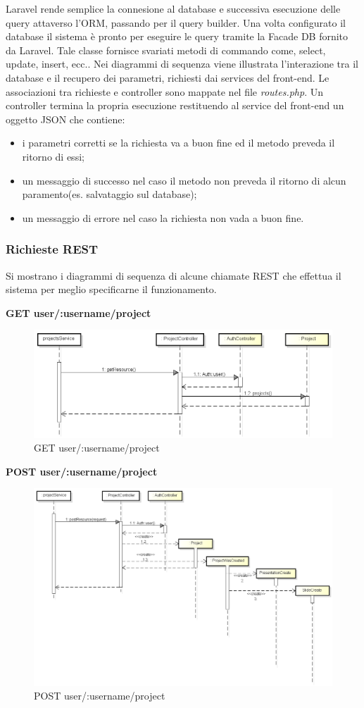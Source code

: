 Laravel rende semplice la connesione al database e successiva esecuzione delle query attaverso l'\gls{ORM}, passando per il query builder. Una volta configurato il \gls{database} il sistema è pronto per eseguire le query tramite la Facade DB fornito da \gls{Laravel}. Tale classe fornisce svariati metodi di commando come, select, update, insert, ecc..
Nei diagrammi di sequenza viene illustrata l'interazione tra il \gls{database} e il recupero dei parametri, richiesti dai services del front-end. Le associazioni tra richieste e controller sono mappate nel file \textit{routes.php}. Un controller termina la propria esecuzione restituendo al service del front-end un oggetto JSON che contiene:
\begin{itemize}
	\item i parametri corretti se la richiesta va a buon fine ed il metodo preveda il ritorno di essi;
	\item un messaggio di successo nel caso il metodo non preveda il ritorno di alcun paramento(es. salvataggio sul \gls{database});
	\item un messaggio di errore nel caso la richiesta non vada a buon fine.
\end{itemize}

\subsubsection{Richieste REST}
Si mostrano i diagrammi di sequenza di alcune chiamate REST che effettua il sistema per meglio specificarne il funzionamento.

\newpage

\textbf{GET user/:username/project}
	\begin{figure}[h]
		\centering
		\includegraphics[width=0.7\linewidth]{img/GET_projects}
		\caption[GET user/:username/project]{GET user/:username/project}
		\label{fig:GET user/:username/project}
	\end{figure}

\textbf{POST user/:username/project}
	\begin{figure}[h]
		\centering
		\includegraphics[width=0.6\linewidth]{img/POST_project}
		\caption[POST user/:username/project]{POST user/:username/project}
		\label{fig:POST user/:username/project}
	\end{figure}

